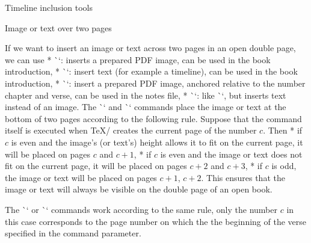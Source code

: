 {{%

\sec Timeline inclusion tools

\secc[spanimage] Image or text over two pages

If we want to insert an image or text across two pages in an open double page, we can
use
\begitems
* \`\insertSpanImage`: inserts a prepared PDF image, can be used in the book introduction,
* \`\insertSpanText`: insert text (for example a timeline), can be used in the book introduction,
* \`\putSpanImage`: insert a prepared PDF image, anchored relative to the number
   chapter and verse, can be used in the notes file,
* \`\putSpanText`: like \`\putSpanImage`, but inserts text instead of an image.
\enditems
The \`\insertSpanImage` and \`\insertSpanText` commands place the image or text 
at the bottom of two pages according to the following rule. Suppose that
the command itself is executed when \TeX/ creates the current page of
the number $c$. Then
\begitems
* if $c$ is even and the image's (or text's) height allows it to fit on the current page,
  it will be placed on pages $c$ and $c+1$,
* if $c$ is even and the image or text does not fit on the current page,
  it will be placed on pages $c+2$ and $c+3$,
* if $c$ is odd, the image or text will be placed on pages $c+1$, $c+2$.
\enditems
This ensures that the image or text will always be visible on the double page
of an open book.

The \`\putSpanImage` or \`\putSpanText` commands work according to the same rule,
only the number $c$ in this case corresponds to the page number on which the
the beginning of the verse specified in the command parameter.

}}
